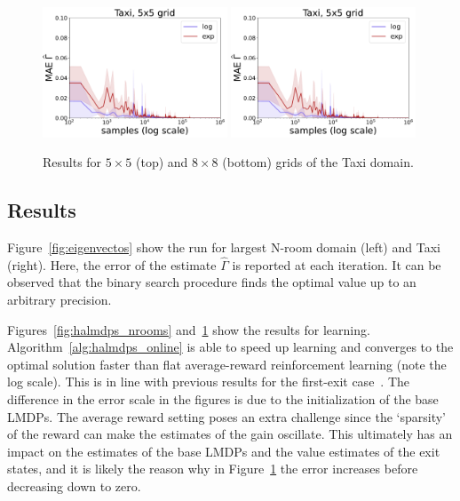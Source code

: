 \begin{figure}[!hb]
\begin{center}
        \includegraphics*[width=0.49\textwidth]{figures/chapter2/online/taxi_5_gammas.pdf}
        \includegraphics*[width=0.49\textwidth]{figures/chapter2/online/taxi_5_gammas.pdf}
        \caption{Results for $5 \times 5$ (top) and $8 \times 8$ (bottom) grids of the Taxi domain.}
          \label{fig:halmdps_taxi}
    \end{center}
  \end{figure}

\subsection{Results}
Figure~\ref{fig:eigenvectos} show the run for largest N-room domain (left) and Taxi (right). Here, the error of the estimate $\widehat\Gamma$ is reported at each iteration. It can be observed that the binary search procedure finds the optimal value up to an arbitrary precision. 

Figures~\ref{fig:halmdps_nrooms} and~\ref{fig:halmdps_taxi} show the results for learning. Algorithm~\ref{alg:halmdps_online} is able to speed up 
learning and converges to the optimal solution faster than flat average-reward reinforcement learning (note the log scale). This is in line with previous results for the first-exit case~\citep{Infante2022}. The difference in the error scale in the figures is due to the initialization of the base LMDPs. The average reward setting poses an extra challenge since the `sparsity' of the reward can make the estimates of the gain oscillate. This ultimately has an impact on the estimates of the base LMDPs and the value estimates of the exit states, and it is likely the reason why in Figure~\ref{fig:halmdps_taxi} the error increases before decreasing down to zero.


